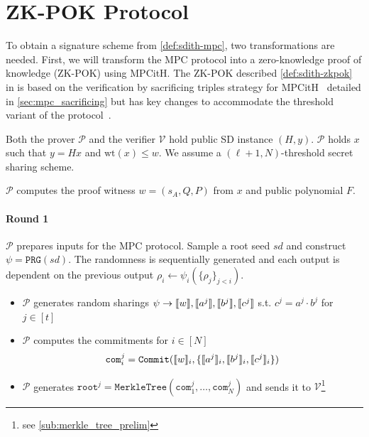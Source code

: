 \documentclass[11pt]{report}
\theoremstyle{definition}
\theoremstyle{plain}
\begin{document}
\section{ZK-POK Protocol}\label{sec:sdith-zkpok}

To obtain a signature scheme from \autoref{def:sdith-mpc}, two transformations are needed. First, we will transform the MPC protocol into a zero-knowledge proof of knowledge (ZK-POK) using MPCitH. The ZK-POK described \autoref{def:sdith-zkpok} in is based on the verification by sacrificing triples strategy for MPCitH~\cite{baum2020concretely} detailed in \autoref{sec:mpc_sacrificing} but has key changes to accommodate the threshold variant of the protocol~\cite{feneuil2023threshold,feneuil2023threshold2}.

\begin{protocol}\label{def:sdith-zkpok}
  \setlength{\parskip}{5pt}
  \setlength{\parindent}{0pt}
  \titlespacing*{\paragraph}{0pt}{1pt}{1em}
  Both the prover $\mathcal{P}$ and the verifier $\mathcal{V}$ hold public SD instance $(H,y)$. $\mathcal{P}$ holds $x$ such that $y = Hx$ and $\text{wt}(x) \leq w$. We assume a $(\ell + 1, N)$-threshold secret sharing scheme.

  $\mathcal{P}$ computes the proof witness $w = (s_A, Q, P)$ from $x$ and public polynomial $F$.

  \paragraph{Round 1}
  $\mathcal{P}$ prepares inputs for the MPC protocol. Sample a root seed $sd$ and construct $\psi = \texttt{PRG}(sd)$. The randomness is sequentially generated and each output is dependent on the previous output $\rho_i \leftarrow \psi_i(\{\rho_j\}_{j < i})$.

  \begin{itemize}[parsep=0pt, itemsep=0pt, topsep=0pt]
    \item $\mathcal{P}$ generates random sharings $\psi \rightarrow \llbracket w \rrbracket, \llbracket a^j \rrbracket, \llbracket b^j \rrbracket, \llbracket c^j \rrbracket$ s.t. $c^j = a^j \cdot b^j$ for $j \in [t]$
    \item $\mathcal{P}$ computes the commitments for $i \in [N]$
          \begin{align*}
            \texttt{com}^j_i = \texttt{Commit}(\llbracket w \rrbracket_i, \{ \llbracket a^j \rrbracket_i, \llbracket b^j \rrbracket_i, \llbracket c^j \rrbracket_i \})
          \end{align*}
    \item $\mathcal{P}$ generates $\texttt{root}^j = \texttt{MerkleTree}(\texttt{com}^j_1, \ldots, \texttt{com}^j_N)$ and sends it to $\mathcal{V}$\footnote{see \autoref{sub:merkle_tree_prelim}}
  \end{itemize}


\end{protocol}
\end{document}
